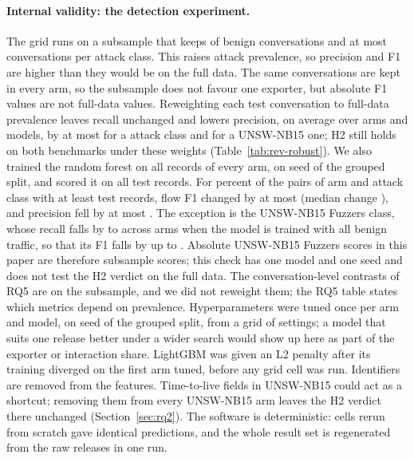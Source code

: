 \paragraph{Internal validity: the detection experiment.} The grid runs on a subsample that keeps \SetBenignFraction{} of benign conversations and at most \SetAttackCap{} conversations per attack class. This raises attack prevalence, so precision and F1 are higher than they would be on the full data. The same conversations are kept in every arm, so the subsample does not favour one exporter, but absolute F1 values are not full-data values. Reweighting each test conversation to full-data prevalence leaves recall unchanged and lowers precision, on average over arms and models, by at most \RevHtPrecMeanMaxCic{} for a \cicids{} attack class and \RevHtPrecMeanMaxUnsw{} for a UNSW-NB15 one; H2 still holds on both benchmarks under these weights (Table~\ref{tab:rev-robust}). We also trained the random forest on all records of every arm, on seed  of the grouped split, and scored it on all test records. For \RevFullWithinFive{} percent of the \RevFullPairs{} pairs of arm and attack class with at least  test records, flow F1 changed by at most  (median change \RevFullFoneMedian{}), and precision fell by at most \RevFullPrecMaxFall{}. The exception is the UNSW-NB15 Fuzzers class, whose recall falls by \RevFullFuzzRecallMin{} to \RevFullFuzzRecallMax{} across arms when the model is trained with all benign traffic, so that its F1 falls by up to \RevFullFoneMaxAbs{}. Absolute UNSW-NB15 Fuzzers scores in this paper are therefore subsample scores; this check has one model and one seed and does not test the H2 verdict on the full data. The conversation-level contrasts of RQ5 are on the subsample, and we did not reweight them; the RQ5 table states which metrics depend on prevalence. Hyperparameters were tuned once per arm and model, on seed  of the grouped split, from a grid of \SetGridSize{} settings; a model that suits one release better under a wider search would show up here as part of the exporter or interaction share. LightGBM was given an L2 penalty after its training diverged on the first arm tuned, before any grid cell was run. Identifiers are removed from the features. Time-to-live fields in UNSW-NB15 could act as a shortcut; removing them from every UNSW-NB15 arm leaves the H2 verdict there unchanged (Section~\ref{sec:rq2}). The software is deterministic: \RQtwoReproCells{} cells rerun from scratch gave identical predictions, and the whole result set is regenerated from the raw releases in one run.

